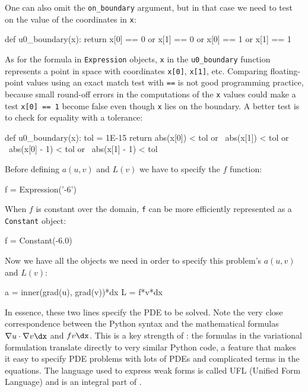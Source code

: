 One can also omit the {\fontsize{10pt}{10pt}\verb!on_boundary!} argument,
but in that case we need to test on the value of the coordinates
in {\fontsize{10pt}{10pt}\texttt{x}}:
\begin{python}
def u0_boundary(x):
    return x[0] == 0 or x[1] == 0 or x[0] == 1 or x[1] == 1
\end{python}
As for the formula in {\fontsize{10pt}{10pt}\verb!Expression!} objects, {\fontsize{10pt}{10pt}\verb!x!} in the
{\fontsize{10pt}{10pt}\verb!u0_boundary!} function represents a point in space with
coordinates {\fontsize{10pt}{10pt}\texttt{x[0]}}, {\fontsize{10pt}{10pt}\texttt{x[1]}}, etc. Comparing floating-point
values using an exact match test with {\fontsize{10pt}{10pt}\texttt{==}} 
is not good programming practice, because small round-off errors in
the computations of the {\fontsize{10pt}{10pt}\texttt{x}} values could make a test
{\fontsize{10pt}{10pt}\texttt{x[0] == 1}} become false even though {\fontsize{10pt}{10pt}\verb!x!} lies on the boundary.
A better test is to check for equality with a tolerance:
\begin{python}
def u0_boundary(x):
    tol = 1E-15
    return abs(x[0]) < tol or \
           abs(x[1]) < tol or \
           abs(x[0] - 1) < tol or \
           abs(x[1] - 1) < tol
\end{python}

Before defining $a(u,v)$ and $L(v)$ we have to specify the $f$ function:
\begin{python}
f = Expression('-6')
\end{python}
When $f$ is constant over the domain, {\fontsize{10pt}{10pt}\texttt{f}} can be
more efficiently represented as a {\fontsize{10pt}{10pt}\texttt{Constant}} object:
\begin{python}
f = Constant(-6.0)
\end{python}
Now we have all the objects we need in order to specify this problem's
$a(u,v)$ and $L(v)$:
\begin{python}
a = inner(grad(u), grad(v))*dx
L = f*v*dx
\end{python}
In essence, these two lines specify the PDE to be solved.
Note the very close correspondence between the Python syntax
and the mathematical formulas $\nabla u\cdot\nabla v\dx$ and
$fv\dx$.
This is a key strength of \fenics: the formulas in the variational
formulation translate directly to very similar Python code, a feature
that makes it easy to specify PDE problems with lots of PDEs and
complicated terms in the equations.
The language used to express weak forms is called UFL (Unified Form Language)
and is an integral part of \fenics.

